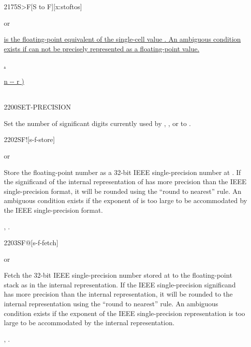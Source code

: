 
\begin{worddef*}[StoF]{2175}{S>F}[S to F][x:stoftos]
\item {}  or 

	\uline{ is the floating-point equivalent of the single-cell
	value .  An ambiguous condition exists if 
	can not be precisely represented as a floating-point value.}

\see \uline{.}

	\begin{implement}
		\uline{\word{:}   n -{}- r )} \\
		\tab \uline{ } \\
		\uline{\word{;}}
	\end{implement}
\end{worddef*}



\begin{worddef}{2200}{SET-PRECISION}
\item {}

	Set the number of significant digits currently used by ,
	, or  to .
\end{worddef}


\begin{worddef}{2202}{SF!}[s-f-store]
\item {}  or

	Store the floating-point number  as a 32-bit IEEE
	single-precision number at . If the significand
	of the internal representation of  has more precision
	than the IEEE single-precision format, it will be rounded using
	the ``round to nearest'' rule. An ambiguous condition exists if
	the exponent of  is too large to be accommodated by the
	IEEE single-precision format.

\see {},
	.
\end{worddef}


\begin{worddef}{2203}{SF@}[s-f-fetch]
\item {}  or

	Fetch the 32-bit IEEE single-precision number stored at
	 to the floating-point stack as  in the
	internal representation. If the IEEE single-precision
	significand has more precision than the internal representation,
	it will be rounded to the internal representation using the
	``round to nearest'' rule. An ambiguous condition exists if the
	exponent of the IEEE single-precision representation is too
	large to be accommodated by the internal representation.

\see {},
	.
\end{worddef}


